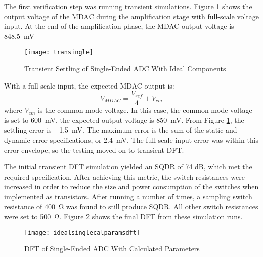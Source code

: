 The first verification step was running transient simulations. Figure \ref{fig:singleendedtran} shows the output voltage of the MDAC during the amplification stage with full-scale voltage input. At the end of the amplification phase, the MDAC output voltage is \SI{848.5}{\milli\volt}
\begin{figure}[htbp]
\centering
\texttt{[image: transingle]}
\caption{Transient Settling of Single-Ended ADC With Ideal Components} 
\label{fig:singleendedtran}
\end{figure}
 With a full-scale input, the expected MDAC output is:
\begin{equation}
\label{eq:fullscalemdacoutput}
V_{MDAC} = \dfrac{V_{ref}}{4} + V_{cm}
\end{equation}
where $V_{cm}$ is the common-mode voltage. In this case, the common-mode voltage is set to \SI{600}{\milli\volt}, the expected output voltage is \SI{850}{\milli\volt}. From Figure \ref{fig:singleendedtran}, the settling error is \SI{-1.5}{\milli\volt}. The maximum error is the sum of the static and dynamic error specifications, or \SI{2.4}{\milli\volt}. The full-scale input error was within this error envelope, so the testing moved on to transient DFT.

The initial transient DFT simulation yielded an SQDR of 74 dB, which met the required specification. After achieving this metric, the switch resistances were increased in order to reduce the size and power consumption of the switches when implemented as transistors. After running a number of times, a sampling switch resistance of \SI{400}{\ohm} was found to still produce SQDR. All other switch resistances were set to \SI{500}{\ohm}. Figure \ref{fig:idealsingletwostagecalcparams} shows the final DFT from these simulation runs.
\begin{figure}[htbp]
\centering
\texttt{[image: idealsinglecalparamsdft]}
\caption{DFT of Single-Ended ADC With Calculated Parameters} 
\label{fig:idealsingletwostagecalcparams}
\end{figure}

